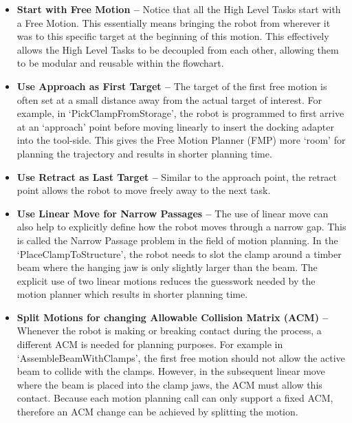 \begin{itemize}
	\item \textbf{Start with Free Motion --} Notice that all the High Level Tasks start with a Free Motion. This essentially means bringing the robot from wherever it was to this specific target at the beginning of this motion. This effectively allows the High Level Tasks to be decoupled from each other, allowing them to be modular and reusable within the flowchart.

	\item \textbf{Use Approach as First Target --} The target of the first free motion is often set at a small distance away from the actual target of interest. For example, in ‘PickClampFromStorage’, the robot is programmed to first arrive at an ‘approach’ point before moving linearly to insert the docking adapter into the tool-side. This gives the Free Motion Planner (FMP) more ‘room’ for planning the trajectory and results in shorter planning time.

	\item \textbf{Use Retract as Last Target --} Similar to the approach point, the retract point allows the robot to move freely away to the next task.

	\item \textbf{Use Linear Move for Narrow Passages --} The use of linear move can also help to explicitly define how the robot moves through a narrow gap. This is called the Narrow Passage problem in the field of motion planning. In the ‘PlaceClampToStructure’, the robot needs to slot the clamp around a timber beam where the hanging jaw is only slightly larger than the beam. The explicit use of two linear motions reduces the guesswork needed by the motion planner which results in shorter planning time.

	\item \textbf{Split Motions for changing Allowable Collision Matrix (ACM) --} Whenever the robot is making or breaking contact during the process, a different ACM is needed for planning purposes. For example in ‘AssembleBeamWithClamps’, the first free motion should not allow the active beam to collide with the clamps. However, in the subsequent linear move where the beam is placed into the clamp jaws, the ACM must allow this contact. Because each motion planning call can only support a fixed ACM, therefore an ACM change can be achieved by splitting the motion.

\end{itemize}

